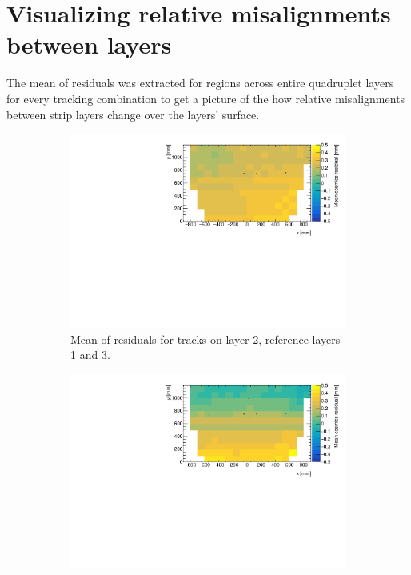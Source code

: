 \section{Visualizing relative misalignments between layers}

The mean of residuals was extracted for regions across entire quadruplet layers for every tracking combination to get a picture of the how relative misalignments between strip layers change over the layers' surface. 

\begin{figure}
\centering
\begin{subfigure}{0.85\textwidth}
  \centering
  \includegraphics[width=\linewidth]{figures/figure_QL2P11_3100V_2021-08-05_fit_means_xray_overlay_layer2_fixedlayers13.pdf}
  \caption{Mean of residuals for tracks on layer 2, reference layers 1 and 3.}
  \label{fig:res_mean_th2_L2_F13}
\end{subfigure}%
\vspace*{\floatsep}
\begin{subfigure}{0.85\textwidth}
  \centering
  \includegraphics[width=\linewidth]{figures/figure_QL2P11_3100V_2021-08-05_fit_means_xray_overlay_layer4_fixedlayers13.pdf}

\end{subfigure}
\end{figure}
